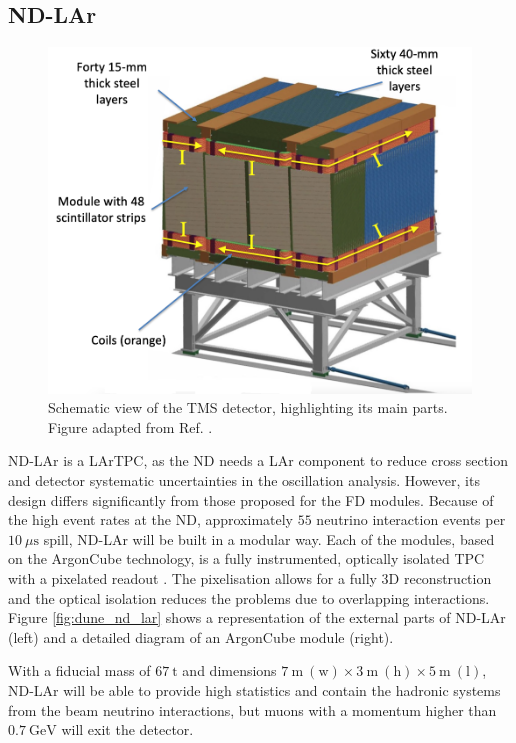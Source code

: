 \subsection{ND-LAr}

\begin{figure}[t]
	\centering
	\includegraphics[width=0.65\linewidth]{Images/DUNE/ND/nd_tms}
	\caption[Schematic view of the TMS detector, highlighting its main parts.]{Schematic view of the TMS detector, highlighting its main parts. Figure adapted from Ref. \cite{DUNE2020TDR1}.}
	\label{fig:dune_tms}
\end{figure}

ND-LAr is a LArTPC, as the ND needs a LAr component to reduce cross section and detector systematic uncertainties in the oscillation analysis. However, its design differs significantly from those proposed for the FD modules. Because of the high event rates at the ND, approximately $55$ neutrino interaction events per $10~\mu\mathrm{s}$ spill, ND-LAr will be built in a modular way. Each of the modules, based on the ArgonCube technology, is a fully instrumented, optically isolated TPC with a pixelated readout \cite{Asaadi2019}. The pixelisation allows for a fully 3D reconstruction and the optical isolation reduces the problems due to overlapping interactions. Figure \ref{fig:dune_nd_lar} shows a representation of the external parts of ND-LAr (left) and a detailed diagram of an ArgonCube module (right).

With a fiducial mass of $67~\mathrm{t}$ and dimensions $7~\mathrm{m} \ (\text{w}) \times 3~\mathrm{m} \ (\text{h}) \times 5~\mathrm{m} \ (\text{l})$, ND-LAr will be able to provide high statistics and contain the hadronic systems from the beam neutrino interactions, but muons with a momentum higher than $0.7~\mathrm{GeV}$ will exit the detector.

